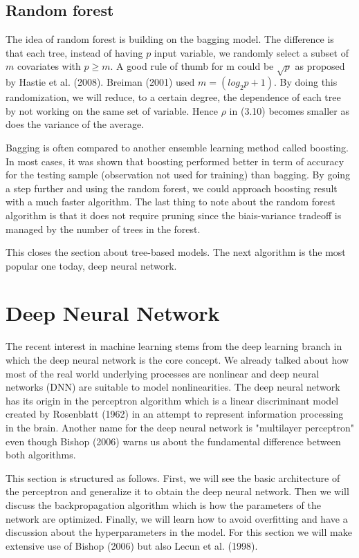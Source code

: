 \documentclass[a4paper,12pt]{article}
\numberwithin{equation}{section}
\begin{document}
\subsection{Random forest}

The idea of random forest is building on the bagging model. The difference is that each tree, instead of having $p$ input variable, we randomly select a subset of $m$ covariates with $ p\geq m$. A good rule of thumb for m could be  $\sqrt{p}$ as proposed by Hastie et al. (2008). Breiman (2001) used $m = (log_2p+1)$. By doing this randomization, we will reduce, to a certain degree, the dependence of each tree by not working on the same set of variable. Hence $\rho$ in (3.10) becomes smaller as does the variance of the average.\par
Bagging is often compared to another ensemble learning method called boosting. In most cases, it was shown that boosting performed better in term of accuracy for the testing sample (observation not used for training) than bagging. By going a step further and using the random forest, we could approach boosting result with a much faster algorithm. The last thing to note about the random forest algorithm is that it does not require pruning since the biais-variance tradeoff is managed by the number of trees in the forest.

This closes the section about tree-based models. The next algorithm is the most popular one today, deep neural network.


\newpage

\section{Deep Neural Network}\label{sec:third}


The recent interest in machine learning stems from the deep learning branch in which the deep neural network is the core concept. We already talked about how most of the real world underlying processes are nonlinear and deep neural networks (DNN) are suitable to model nonlinearities. The deep neural network has its origin in the perceptron algorithm which is a linear discriminant model created by Rosenblatt (1962) in an attempt to represent information processing in the brain. Another name for the deep neural network is "multilayer perceptron" even though Bishop (2006) warns us about the fundamental difference between both algorithms. \par
This section is structured as follows. First, we will see the basic architecture of the perceptron and generalize it to obtain the deep neural network. Then we will discuss the backpropagation algorithm which is how the parameters of the network are optimized. Finally, we will learn how to avoid overfitting and have a discussion about the hyperparameters in the model. For this section we will make extensive use of Bishop (2006) but also Lecun et al. (1998).
\end{document}
